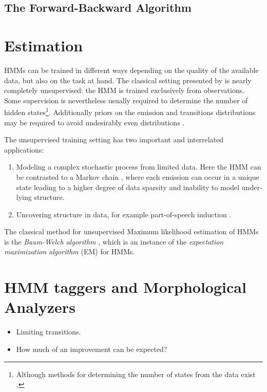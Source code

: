 \subsection{The Forward-Backward Algorithm}
\label{hmm-fw-bw}

\section{Estimation}

HMMs can be trained in different ways depending on the quality of the
available data, but also on the task at hand. The classical setting
presented by \cite{Rabiner1989} is nearly completely unsupervised: the
HMM is trained exclusively from observations. Some supervision is
nevertheless usually required to determine the number of hidden
states\footnote{Although methods for determining the number of states
  from the data exist \citep{foo}.}. Additionally priors on the
emission and transitions distributions may be required to avoid
undesirably even distributions
\citep{Cutting1992,Johnson2007}.

The unsupervised training setting has two important and
interrelated applications:
\begin{enumerate}
\item Modeling a complex stochastic process from limited data. Here
  the HMM can be contrasted to a Markov chain \citep[318--320]{Manning1999}, where
  each emission can occur in a unique state leading to a higher degree
  of data sparsity and inability to model under-lying structure.
\item Uncovering structure in data, for example part-of-speech
  induction \citep{Johnson2007}.
\end{enumerate}
The classical method for unsupervised Maximum likelihood estimation of
HMMs is the {\it Baum-Welch algorithm} \citep{Rabiner1989}, which is
an instance of the {\it expectation maximization algorithm} (EM)
\citep{Dempster1977} for HMMs.

\section{HMM taggers and Morphological Analyzers}
\begin{itemize}
\item Limiting transitions.
\item How much of an improvement can be expected?
\end{itemize}


